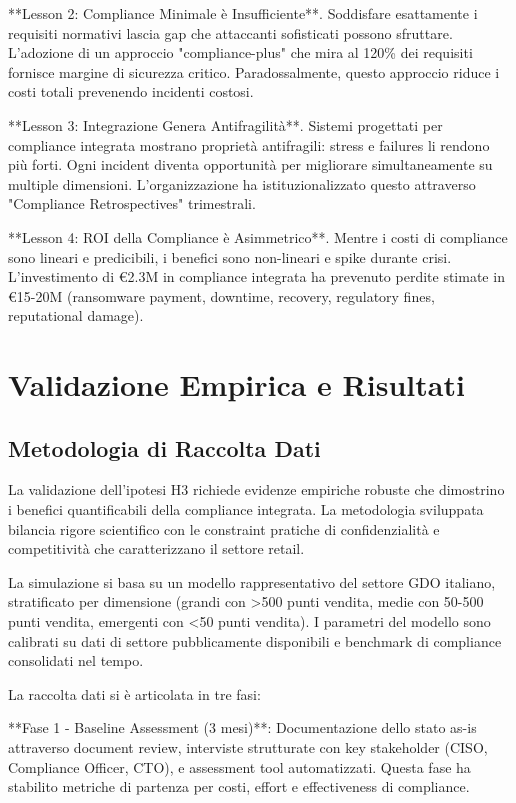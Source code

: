 **Lesson 2: Compliance Minimale è Insufficiente**. Soddisfare esattamente i requisiti normativi lascia gap che attaccanti sofisticati possono sfruttare. L'adozione di un approccio "compliance-plus" che mira al 120\% dei requisiti fornisce margine di sicurezza critico. Paradossalmente, questo approccio riduce i costi totali prevenendo incidenti costosi.

**Lesson 3: Integrazione Genera Antifragilità**. Sistemi progettati per compliance integrata mostrano proprietà antifragili: stress e failures li rendono più forti. Ogni incident diventa opportunità per migliorare simultaneamente su multiple dimensioni. L'organizzazione ha istituzionalizzato questo attraverso "Compliance Retrospectives" trimestrali.

**Lesson 4: ROI della Compliance è Asimmetrico**. Mentre i costi di compliance sono lineari e predicibili, i benefici sono non-lineari e spike durante crisi. L'investimento di €2.3M in compliance integrata ha prevenuto perdite stimate in €15-20M (ransomware payment, downtime, recovery, regulatory fines, reputational damage).

\section{Validazione Empirica e Risultati}

\subsection{Metodologia di Raccolta Dati}

La validazione dell'ipotesi H3 richiede evidenze empiriche robuste che dimostrino i benefici quantificabili della compliance integrata. La metodologia sviluppata bilancia rigore scientifico con le constraint pratiche di confidenzialità e competitività che caratterizzano il settore retail.

La simulazione si basa su un modello rappresentativo del settore GDO italiano, stratificato per dimensione (grandi con >500 punti vendita, medie con 50-500 punti vendita, emergenti con <50 punti vendita). I parametri del modello sono calibrati su dati di settore pubblicamente disponibili e benchmark di compliance consolidati nel tempo.

La raccolta dati si è articolata in tre fasi:

**Fase 1 - Baseline Assessment (3 mesi)**: Documentazione dello stato as-is attraverso document review, interviste strutturate con key stakeholder (CISO, Compliance Officer, CTO), e assessment tool automatizzati. Questa fase ha stabilito metriche di partenza per costi, effort e effectiveness di compliance.

